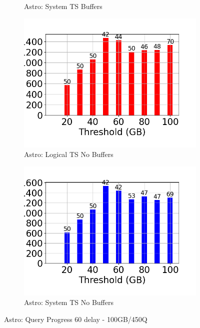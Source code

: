 \begin{figure}
\begin{subfigure}[c]{0.48\textwidth}
		\caption{Astro: System TS Buffers}
		\label{fig:system-ts-60-astro}
	\end{subfigure}
	\begin{subfigure}[c]{0.48\textwidth}
		\includegraphics[width=1\textwidth]	 {figures/Experiments/Dynamic/ASTRO/Batch_processing/60/average_query_time_per_batch_version_999777016_10485760_10_delay[60].png}
		\caption{Astro: Logical TS No Buffers}
		\label{fig:logical-ts-no-60-astro}
	\end{subfigure}
	\begin{subfigure}[c]{0.48\textwidth}
		\includegraphics[width=1\textwidth]	 {figures/Experiments/Dynamic/ASTRO/Batch_processing/60/average_query_time_per_batch_version_999777017_10485760_10_delay[60].png}
		\caption{Astro: System TS No Buffers}
		\label{fig:system-ts-no-60-astro}
	\end{subfigure}
	\caption{Astro: Query Progress 60 delay - 100GB/450Q}
	\label{fig:query-progress-60-astro}
\end{figure}
